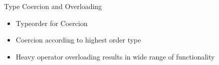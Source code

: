 \documentclass{beamer}
\begin{document}
\begin{frame}[fragile]
  \vspace{0.5cm}
    Type Coercion and Overloading

    \begin{itemize}
        \item Typeorder for Coercion
        \item Coercion according to highest order type
        \item Heavy operator overloading results in wide range of functionality

    \end{itemize}

%

\end{frame}
\end{document}
